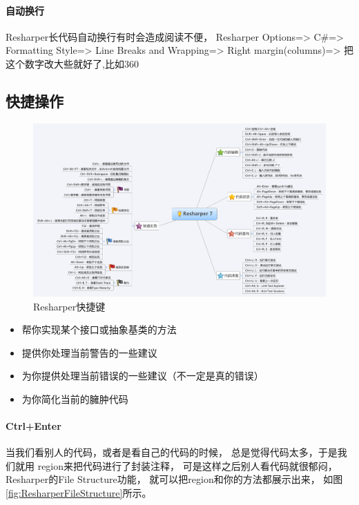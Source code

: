 \documentclass{book}
\begin{document}
\paragraph{自动换行}Resharper长代码自动换行有时会造成阅读不便，
Resharper Options=>
C\#=>
Formatting Style=>
Line Breaks and Wrapping=>
Right margin(columns)=> 把这个数字改大些就好了,比如360

\subsection{快捷操作}

\begin{figure}[htbp]
	\centering
	\includegraphics[scale=0.3]{ReSharperShortcut.png}
	\caption{Resharper快捷键}
	\label{fig:ReSharperShortcut}
\end{figure}

\begin{itemize}
\item{帮你实现某个接口或抽象基类的方法}
\item{提供你处理当前警告的一些建议}
\item{为你提供处理当前错误的一些建议（不一定是真的错误）}
\item{为你简化当前的臃肿代码}
\end{itemize}

\paragraph{Ctrl+Enter}

当我们看别人的代码，或者是看自己的代码的时候，
总是觉得代码太多，于是我们就用 region来把代码进行了封装注释，
可是这样之后别人看代码就很郁闷，Resharper的File Structure功能，
就可以把region和你的方法都展示出来，
如图\ref{fig:ResharperFileStructure}所示。
\end{document}
